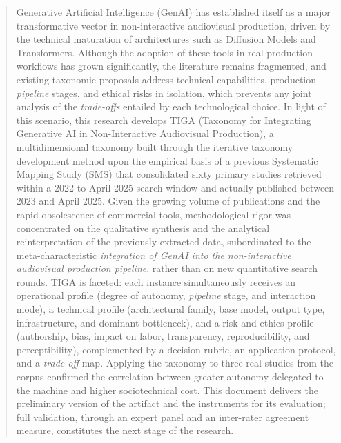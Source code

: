 \begin{abstract}

    
    Generative Artificial Intelligence (GenAI) has established itself as a major transformative vector in non-interactive audiovisual production, driven by the technical maturation of architectures such as Diffusion Models and Transformers. Although the adoption of these tools in real production workflows has grown significantly, the literature remains fragmented, and existing taxonomic proposals address technical capabilities, production \textit{pipeline} stages, and ethical risks in isolation, which prevents any joint analysis of the \textit{trade-offs} entailed by each technological choice. In light of this scenario, this research develops TIGA (Taxonomy for Integrating Generative AI in Non-Interactive Audiovisual Production), a multidimensional taxonomy built through the iterative taxonomy development method upon the empirical basis of a previous Systematic Mapping Study (SMS) that consolidated sixty primary studies retrieved within a 2022 to April 2025 search window and actually published between 2023 and April 2025. Given the growing volume of publications and the rapid obsolescence of commercial tools, methodological rigor was concentrated on the qualitative synthesis and the analytical reinterpretation of the previously extracted data, subordinated to the meta-characteristic \textit{integration of GenAI into the non-interactive audiovisual production pipeline}, rather than on new quantitative search rounds. TIGA is faceted: each instance simultaneously receives an operational profile (degree of autonomy, \textit{pipeline} stage, and interaction mode), a technical profile (architectural family, base model, output type, infrastructure, and dominant bottleneck), and a risk and ethics profile (authorship, bias, impact on labor, transparency, reproducibility, and perceptibility), complemented by a decision rubric, an application protocol, and a \textit{trade-off} map. Applying the taxonomy to three real studies from the corpus confirmed the correlation between greater autonomy delegated to the machine and higher sociotechnical cost. This document delivers the preliminary version of the artifact and the instruments for its evaluation; full validation, through an expert panel and an inter-rater agreement measure, constitutes the next stage of the research.
    
    
    
    \end{abstract}
    